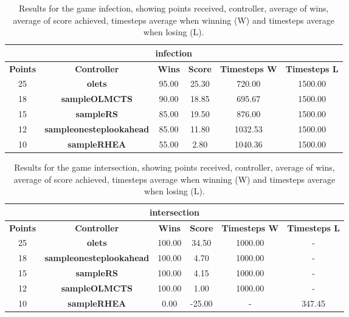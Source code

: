 \begin{table*}[!t]
\begin{center}
\begin{tabular}{|c|c|c|c|c|c|}
\multicolumn{6}{c}{\textbf{infection}}\\
\hline
\textbf{Points} & \textbf{Controller} & \textbf{Wins} &  \textbf{Score} & \textbf{Timesteps W} & \textbf{Timesteps L}\\
\hline
25 & \textbf{olets} & 95.00 & 25.30 & 720.00 & 1500.00
 \\
\hline
18 & \textbf{sampleOLMCTS} & 90.00 & 18.85 & 695.67 & 1500.00
 \\
\hline
15 & \textbf{sampleRS} & 85.00 & 19.50 & 876.00 & 1500.00
 \\
\hline
12 & \textbf{sampleonesteplookahead} & 85.00 & 11.80 & 1032.53 & 1500.00
 \\
\hline
10 & \textbf{sampleRHEA} & 55.00 & 2.80 & 1040.36 & 1500.00
 \\
\hline
\end{tabular}
\caption{Results for the game infection, showing points received, controller, average of wins, average of score achieved, timesteps average when winning (W) and timesteps average when losing (L).}
\label{tab:weights}
\end{center}
\end{table*}
\begin{table*}[!t]
\begin{center}
\begin{tabular}{|c|c|c|c|c|c|}
\multicolumn{6}{c}{\textbf{intersection}}\\
\hline
\textbf{Points} & \textbf{Controller} & \textbf{Wins} &  \textbf{Score} & \textbf{Timesteps W} & \textbf{Timesteps L}\\
\hline
25 & \textbf{olets} & 100.00 & 34.50 & 1000.00 &  - 
 \\
\hline
18 & \textbf{sampleonesteplookahead} & 100.00 & 4.70 & 1000.00 &  - 
 \\
\hline
15 & \textbf{sampleRS} & 100.00 & 4.15 & 1000.00 &  - 
 \\
\hline
12 & \textbf{sampleOLMCTS} & 100.00 & 1.00 & 1000.00 &  - 
 \\
\hline
10 & \textbf{sampleRHEA} & 0.00 & -25.00 &  -  & 347.45
 \\
\hline
\end{tabular}
\caption{Results for the game intersection, showing points received, controller, average of wins, average of score achieved, timesteps average when winning (W) and timesteps average when losing (L).}
\label{tab:weights}
\end{center}
\end{table*}
